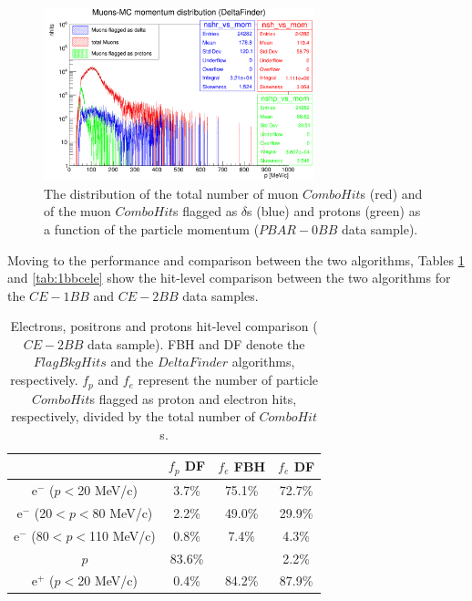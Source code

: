  \begin{figure}[!h]
            \centering
            \includegraphics[width =0.7\textwidth]{figures/png/Screenshot_20240805_222923.png}
        \caption[The  
        distribution of the total 
        and flagged number of muon 
        $ComboHit$s as a function of the particle momentum.]{The  
        distribution of the total number of 
        muon $ComboHit$s 
        (red) and of the muon $ComboHit$s 
        flagged as $\delta$s (blue) 
        and protons (green) as a function of the particle momentum ($PBAR-0BB$ data sample). }
           \label{fig:0pbarbefore}
\end{figure}

Moving to the performance and comparison 
between the two algorithms, Tables \ref{tab:2bbcele} and \ref{tab:1bbcele} 
show the hit-level comparison between the two algorithms 
for the $CE-1BB$ and $CE-2BB$ data samples.
\begin{center}
    \begin{table}[h!]
    \centering
    \renewcommand{\arraystretch}{1.}
    \begin{tabular}{| c | c | c | c |} 
    \hline
    &    $f_{p}$ DF & $f_{e}$ FBH  & $f_{e}$ DF \\
    \hline
    e$^-$ ($p<$20 MeV/c)      & 3.7\%   & 75.1\% & 72.7\%\\
    \hline
    e$^-$ (20$<p<$80 MeV/c)  & 2.2\%   & 49.0\%& 29.9\%\\
    \hline
    e$^-$ (80$<p<$110 MeV/c)  & 0.8\%  &  7.4\%& 4.3\%\\
    \hline
    $p$       &  83.6\%  &  & 2.2\%\\
    \hline
    e$^+$ ($p<$20 MeV/c) & 0.4\%    &   84.2\%& 87.9\%\\
    \hline
    \end{tabular}
    \caption{Electrons, 
    positrons and protons hit-level 
    comparison ($CE-2BB$ data sample). 
    FBH and DF denote  
    the $FlagBkgHits$ and the 
    $DeltaFinder$ algorithms, 
    respectively. $f_p$ and $f_e$ represent 
    the number of particle $ComboHit$s 
    flagged as proton and electron hits, respectively, 
    divided by the total number of $ComboHit$s.
    }\label{tab:2bbcele}
    \end{table}
    \end{center}

